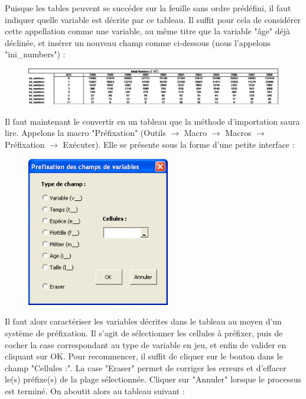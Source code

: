 \documentclass[12pt, colorinlistoftodos, notitlepage]{report}
\newenvironment{not used}[1]{%
    \longtable{%
        |>{\centering$\displaystyle}A{#1}{1}<{$}%
        |}\hline\ignorespaces}{%
    \endlongtable\ignorespacesafterend}
\begin{document}
Puisque les tables peuvent se succéder sur la feuille sans ordre prédéfini, il faut indiquer quelle variable est décrite par ce tableau. Il suffit pour cela de considérer cette appellation comme une variable, au même titre que la variable "âge" déjà déclinée, et insérer un nouveau champ comme ci-dessous (nous l'appelons "ini\_numbers") :

\begin{figure}[h!]
    \begin{center}
    \includegraphics[width = \textwidth]{figures/param/stock2.png}
    \end{center}
    \label{fig:ini_num}
\end{figure}

Il faut maintenant le convertir en un tableau que la méthode d'importation saura lire. Appelons la macro "Préfixation" (Outils $ \to $ Macro $ \to $ Macros $ \to $ Préfixation $ \to $ Exécuter). Elle se présente sous la forme d'une petite interface :

\begin{figure}[H]
    \begin{center}
    \includegraphics[width = 6.24cm]{figures/param/stock3.png}
    \end{center}
    \label{fig:prefix}
\end{figure}

Il faut alors caractériser les variables décrites dans le tableau au moyen d'un système de préfixation. Il s'agit de sélectionner les cellules à préfixer, puis de cocher la case correspondant au type de variable en jeu, et enfin de valider en cliquant sur OK. Pour recommencer, il suffit de cliquer sur le bouton dans le champ "Cellules :". La case "Eraser" permet de corriger les erreurs et d'effacer le(s) préfixe(s) de la plage sélectionnée. Cliquer sur "Annuler" lorsque le processus est terminé. On aboutit alors au tableau suivant :
\end{document}

